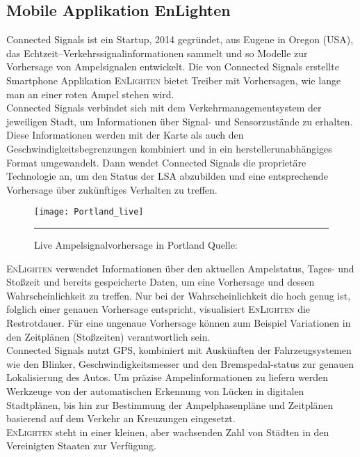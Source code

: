 \subsection*{Mobile Applikation EnLighten}
Connected Signals ist ein Startup, 2014 gegründet, aus Eugene in Oregon (USA), das Echtzeit--Verkehrssignalinformationen sammelt und so Modelle zur Vorhersage von Ampelsignalen entwickelt. Die von Connected Signals erstellte Smartphone Applikation \textsc{EnLighten} bietet Treiber mit Vorhersagen, wie lange man an einer roten Ampel stehen wird. \cite{connectedSignals} \\
Connected Signals verbindet sich mit dem Verkehrmanagementsystem der jeweiligen Stadt, um Informationen über Signal- und Sensorzustände zu erhalten. Diese Informationen werden mit der Karte als auch den Geschwindigkeitsbegrenzungen kombiniert und in ein herstellerunabhängiges Format umgewandelt. Dann wendet Connected Signals die proprietäre Technologie an, um den Status der \gls{LSA} abzubilden und eine entsprechende Vorhersage über zukünftiges Verhalten zu treffen. \cite{signals} 
\begin{figure}[H]
    \centering
    \texttt{[image: Portland\_live]} 
    \rule{35em}{0.5pt}
    \label{fig:enlighten}
    \caption[Connected Signals live Vorhersage]{Live Ampelsignalvorhersage in Portland Quelle: \cite{signals}}
\end{figure}
\textsc{EnLighten} verwendet Informationen über den aktuellen Ampelstatus, Tages- und Stoßzeit und bereits gespeicherte Daten, um eine Vorhersage und dessen Wahrscheinlichkeit zu treffen. Nur bei der Wahrscheinlichkeit die hoch genug ist, folglich einer genauen Vorhersage entspricht, visualisiert \textsc{EnLighten} die Restrotdauer. Für eine ungenaue Vorhersage können zum Beispiel Variationen in den Zeitplänen (Stoßzeiten) verantwortlich sein.\\  
Connected Signals nutzt \gls{GPS}, kombiniert mit Auskünften der Fahrzeugsystemen wie den Blinker, Geschwindigkeitsmesser und den Bremspedal-status zur genauen Lokalisierung des Autos. Um präzise Ampelinformationen zu liefern werden Werkzeuge von der automatischen Erkennung von Lücken in digitalen Stadtplänen, bis hin zur Bestimmung der Ampelphasenpläne und Zeitplänen basierend auf dem Verkehr an Kreuzungen eingesetzt. \cite{EnLighten} \\
\textsc{EnLighten} steht in einer kleinen, aber wachsenden Zahl von Städten in den Vereinigten Staaten zur Verfügung. 
